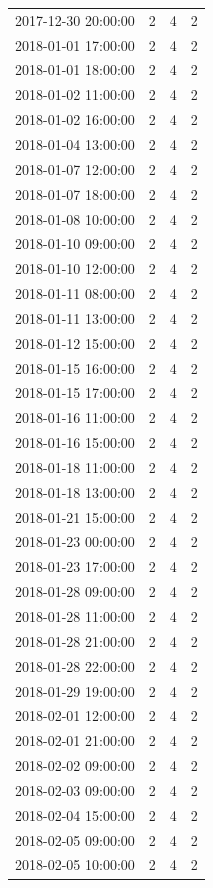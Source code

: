 \begin{tabular}{lrrr}
2017-12-30 20:00:00 & 2 & 4 & 2 \\
2018-01-01 17:00:00 & 2 & 4 & 2 \\
2018-01-01 18:00:00 & 2 & 4 & 2 \\
2018-01-02 11:00:00 & 2 & 4 & 2 \\
2018-01-02 16:00:00 & 2 & 4 & 2 \\
2018-01-04 13:00:00 & 2 & 4 & 2 \\
2018-01-07 12:00:00 & 2 & 4 & 2 \\
2018-01-07 18:00:00 & 2 & 4 & 2 \\
2018-01-08 10:00:00 & 2 & 4 & 2 \\
2018-01-10 09:00:00 & 2 & 4 & 2 \\
2018-01-10 12:00:00 & 2 & 4 & 2 \\
2018-01-11 08:00:00 & 2 & 4 & 2 \\
2018-01-11 13:00:00 & 2 & 4 & 2 \\
2018-01-12 15:00:00 & 2 & 4 & 2 \\
2018-01-15 16:00:00 & 2 & 4 & 2 \\
2018-01-15 17:00:00 & 2 & 4 & 2 \\
2018-01-16 11:00:00 & 2 & 4 & 2 \\
2018-01-16 15:00:00 & 2 & 4 & 2 \\
2018-01-18 11:00:00 & 2 & 4 & 2 \\
2018-01-18 13:00:00 & 2 & 4 & 2 \\
2018-01-21 15:00:00 & 2 & 4 & 2 \\
2018-01-23 00:00:00 & 2 & 4 & 2 \\
2018-01-23 17:00:00 & 2 & 4 & 2 \\
2018-01-28 09:00:00 & 2 & 4 & 2 \\
2018-01-28 11:00:00 & 2 & 4 & 2 \\
2018-01-28 21:00:00 & 2 & 4 & 2 \\
2018-01-28 22:00:00 & 2 & 4 & 2 \\
2018-01-29 19:00:00 & 2 & 4 & 2 \\
2018-02-01 12:00:00 & 2 & 4 & 2 \\
2018-02-01 21:00:00 & 2 & 4 & 2 \\
2018-02-02 09:00:00 & 2 & 4 & 2 \\
2018-02-03 09:00:00 & 2 & 4 & 2 \\
2018-02-04 15:00:00 & 2 & 4 & 2 \\
2018-02-05 09:00:00 & 2 & 4 & 2 \\
2018-02-05 10:00:00 & 2 & 4 & 2 \\

\end{tabular}
